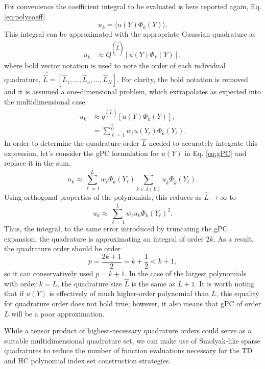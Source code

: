 For convenience the coefficient integral to be evaluated is here reported again, Eq.
\ref{eq:polycoeff}.
\begin{equation}
  u_k = \langle u(Y)\Phi_k(Y) \rangle.
\end{equation}
This integral can be approximated with the appropriate Gaussian quadrature as
\begin{align}
  u_k &\approx Q^{(\vec{\hat L})}[u(Y)\Phi_k(Y)],
\end{align}
where bold vector notation is used to note the order of each individual quadrature,
$\vec{\hat L} = [\hat L_1, \ldots,\hat L_n,\ldots,\hat L_N]$. For clarity, the bold notation is removed and
it is assumed a one-dimensional problem, which extrapolates as expected into the multidimensional case.
\begin{align}
  u_k &\approx q^{(\hat L)}[u(Y)\Phi_k(Y)],\\
      &= \sum_{\ell=1}^{\hat L} w_\ell u(Y_\ell)\Phi_k(Y_\ell).
\end{align}
In order to determine the quadrature order $\hat L$ needed to accurately integrate this expression, let's consider the
gPC formulation for $u(Y)$ in Eq. \ref{eq:gPC} and replace it in the sum,
\begin{equation}
  u_k\approx \sum_{\ell=1}^{\hat L} w_\ell \Phi_k(Y_\ell) \sum_{k\in\Lambda(L)}u_{\hat k}\Phi_{\hat k}(Y_\ell).
\end{equation}
Using orthogonal properties of the polynomials, this reduces as $\hat L\to\infty$ to
\begin{equation}
  u_k\approx \sum_{\ell=1}^{\hat L} w_\ell u_k \Phi_k(Y_\ell)^2.
\end{equation}
Thus, the integral, to the same error introduced by truncating the  gPC expansion, the quadrature is
approximating an integral of order $2k$. As a result, the quadrature order should be order 
\begin{equation}
  p=\frac{2k+1}{2}=k+\frac{1}{2}<k+1,
\end{equation}
so it  can conservatively used  $p=k+1$.  In the case of the largest polynomials with order
$k=L$, the quadrature size $\hat L$ is the same as $L+1$.  It is worth noting that if $u(Y)$ is effectively of
much higher-order polynomial than $L$, this equality for quadrature order does not hold true; however, it also
means that gPC of order $L$ will be a poor approximation.

While a tensor product of highest-necessary quadrature orders could serve as a suitable multidimensional
quadrature set, we can make use of Smolyak-like sparse quadratures to reduce the number of function
evaluations necessary for the TD and HC polynomial index set construction strategies.

